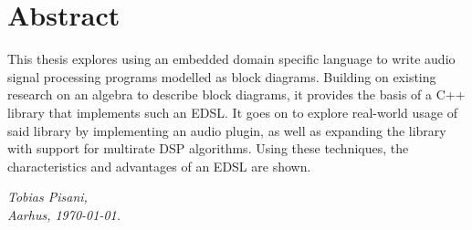 \section*{Abstract}

This thesis explores using an embedded domain specific language to write audio signal processing programs
modelled as block diagrams. Building on existing research on an algebra to describe block diagrams, it
provides the basis of a C++ library that implements such an EDSL. It goes on to explore real-world usage of
said library by implementing an audio plugin, as well as expanding the library with support for multirate DSP
algorithms. Using these techniques, the characteristics and advantages of an EDSL are shown.

\vspace{2ex}
\begin{flushright}
  \emph{Tobias Pisani,}\\
  \emph{Aarhus, \today.}
\end{flushright}

